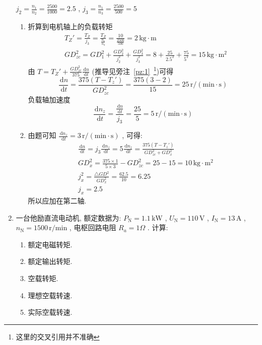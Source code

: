 \documentclass[lang=cn,11pt,marginpar=margintrue]{elegantbook}%
\newcommand{\dd}{\zt{d}}
\newcommand{\zt}[1]{\,\mathrm{#1}}
\newcommand{\NN}{\mathrm{N}}
\begin{document}
\begin{enumerate}
		\begin{solution}
			$j_2=\frac{n_1}{n_2}=\frac{2500}{1000}=2.5$ , $j_3=\frac{n_1}{n_3}=\frac{2500}{500}=5$
			\begin{enumerate}
				\item 折算到电机轴上的负载转矩
					\begin{align*}
						&T_Z'=\frac{T_Z}{j_3}=\frac{T_Z}{\frac{n_1}{n_3}}=\frac{10}{\frac{2500}{500}}=2\zt{kg\cdot m}\\
						&GD_{zc}^2=GD_1^2+\frac{GD_2^2}{j_2^2}+\frac{GD_3^2}{j_3^2}=8+\frac{25}{2.5^2}+\frac{75}{5^2}=15\zt{kg\cdot m^2}
					\end{align*}
					由 $T=T_Z'+\frac{GD_{zc}^2}{375}\frac{\dd n}{\dd t}$ (推导见旁注~\ref{pz:1}~\footnote{这里的交叉引用并不准确})可得
					\begin{equation*}
						\frac{\dd n}{\dd t}=\frac{375(T-T_{z}')}{GD_{zc}^2}=\frac{375(3-2)}{15}=25\zt{r/(min\cdot s)}
					\end{equation*}
					负载轴加速度
					\begin{equation*}
						\frac{\dd n_z}{\dd t}=\frac{\frac{\dd n}{\dd t}}{j_3}=\frac{25}{5}=5\zt{r/(min\cdot s)}
					\end{equation*}
				\item 由题可知 $\frac{\dd n_z}{\dd t}=3\zt{r/(min\cdot s)}$ , 可得:
				\begin{align*}
					&\frac{\dd n}{\dd t}=j_3\frac{\dd n_z}{\dd t}=5\frac{\dd n_z}{\dd t}=\frac{375(T-T_z')}{GD_{zc}^2+GD_x^2}\\
					&GD_{x}^2=\frac{375\times 1}{5\times 3}-GD_{zc}^2=25-15=10\zt{kg\cdot m^2}\\
					&j_x^2=\frac{\triangle GD^2}{GD_x^2}=\frac{62.5}{10}=6.25\\
					&j_x=2.5
				\end{align*}
				所以应加在第二轴.
			\end{enumerate}
		\end{solution}
	\item \label{js:3}一台他励直流电动机, 额定数据为: $P_{\NN}=1.1\zt{kW}$ , $U_{\NN}=110\zt{V}$ , $I_{\NN}=13\zt{A}$ , $n_{\NN}=1500\zt{r/min}$ , 电枢回路电阻 $R_a=1\Omega$ . 计算:
		\begin{enumerate}
			\item 额定电磁转矩.
			\item 额定输出转矩.
			\item 空载转矩.
			\item 理想空载转速.
			\item 实际空载转速.

\end{enumerate}
\end{enumerate}
\end{document}
